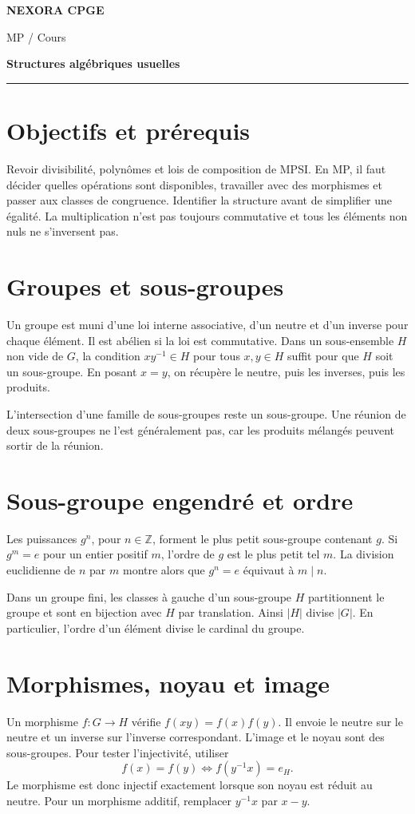 \documentclass[11pt,a4paper]{article}
\begin{document}
{\small\bfseries\color{nexorablue} NEXORA CPGE}\par
{\small MP / Cours}\par
{\LARGE\bfseries Structures algébriques usuelles}\par
\vspace{0.25em}\hrule\vspace{0.6em}

\section*{Objectifs et prérequis}
Revoir divisibilité, polynômes et lois de composition de MPSI. En MP, il faut décider quelles opérations sont disponibles, travailler avec des morphismes et passer aux classes de congruence. Identifier la structure avant de simplifier une égalité. La multiplication n’est pas toujours commutative et tous les éléments non nuls ne s’inversent pas.

\section*{Groupes et sous-groupes}
Un groupe est muni d’une loi interne associative, d’un neutre et d’un inverse pour chaque élément. Il est abélien si la loi est commutative. Dans un sous-ensemble $H$ non vide de $G$, la condition $xy^{-1}\in H$ pour tous $x,y\in H$ suffit pour que $H$ soit un sous-groupe. En posant $x=y$, on récupère le neutre, puis les inverses, puis les produits.

L’intersection d’une famille de sous-groupes reste un sous-groupe. Une réunion de deux sous-groupes ne l’est généralement pas, car les produits mélangés peuvent sortir de la réunion.

\section*{Sous-groupe engendré et ordre}
Les puissances $g^n$, pour $n\in\mathbb Z$, forment le plus petit sous-groupe contenant $g$. Si $g^m=e$ pour un entier positif $m$, l’ordre de $g$ est le plus petit tel $m$. La division euclidienne de $n$ par $m$ montre alors que $g^n=e$ équivaut à $m\mid n$.

Dans un groupe fini, les classes à gauche d’un sous-groupe $H$ partitionnent le groupe et sont en bijection avec $H$ par translation. Ainsi $|H|$ divise $|G|$. En particulier, l’ordre d’un élément divise le cardinal du groupe.

\section*{Morphismes, noyau et image}
Un morphisme $f:G\to H$ vérifie $f(xy)=f(x)f(y)$. Il envoie le neutre sur le neutre et un inverse sur l’inverse correspondant. L’image et le noyau sont des sous-groupes. Pour tester l’injectivité, utiliser
\[ f(x)=f(y)\iff f(y^{-1}x)=e_H. \]
Le morphisme est donc injectif exactement lorsque son noyau est réduit au neutre. Pour un morphisme additif, remplacer $y^{-1}x$ par $x-y$.
\end{document}
